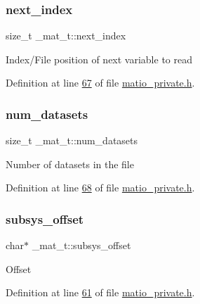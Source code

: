 \mbox{\label{struct__mat__t_a0163a12f9735356723bb604992639d9e}} 
\subsubsection{\texorpdfstring{next\+\_\+index}{next\_index}}
{\footnotesize\ttfamily size\+\_\+t \+\_\+mat\+\_\+t\+::next\+\_\+index}

Index/\+File position of next variable to read 

Definition at line \hyperlink{matio__private_8h_source_l00067}{67} of file \hyperlink{matio__private_8h_source}{matio\+\_\+private.\+h}.

\mbox{\label{struct__mat__t_af37d0ba323e65edb27ecd5a2f766a3a4}} 
\subsubsection{\texorpdfstring{num\+\_\+datasets}{num\_datasets}}
{\footnotesize\ttfamily size\+\_\+t \+\_\+mat\+\_\+t\+::num\+\_\+datasets}

Number of datasets in the file 

Definition at line \hyperlink{matio__private_8h_source_l00068}{68} of file \hyperlink{matio__private_8h_source}{matio\+\_\+private.\+h}.

\mbox{\label{struct__mat__t_a19317c01209959d755d69311960d3eec}} 
\subsubsection{\texorpdfstring{subsys\+\_\+offset}{subsys\_offset}}
{\footnotesize\ttfamily char$\ast$ \+\_\+mat\+\_\+t\+::subsys\+\_\+offset}

Offset 

Definition at line \hyperlink{matio__private_8h_source_l00061}{61} of file \hyperlink{matio__private_8h_source}{matio\+\_\+private.\+h}.

